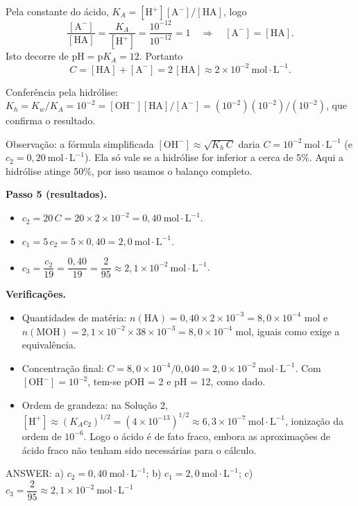 \documentclass{article}%
\begin{document}
Pela constante do ácido, $K_A = [\text{H}^+][\text{A}^-]/[\text{HA}]$, logo
\[
\frac{[\text{A}^-]}{[\text{HA}]} = \frac{K_A}{[\text{H}^+]} = \frac{10^{-12}}{10^{-12}} = 1 \quad\Rightarrow\quad [\text{A}^-] = [\text{HA}].
\]
Isto decorre de $\text{pH} = \text{p}K_A = 12$. Portanto
\[
C = [\text{HA}] + [\text{A}^-] = 2\,[\text{HA}] \approx 2 \times 10^{-2}\ \text{mol}\cdot\text{L}^{-1}.
\]

Conferência pela hidrólise: $K_h = K_w/K_A = 10^{-2} = [\text{OH}^-][\text{HA}]/[\text{A}^-] = (10^{-2})(10^{-2})/(10^{-2})$, que confirma o resultado.

Observação: a fórmula simplificada $[\text{OH}^-] \approx \sqrt{K_h\,C}$ daria $C = 10^{-2}\ \text{mol}\cdot\text{L}^{-1}$ (e $c_2 = 0{,}20\ \text{mol}\cdot\text{L}^{-1}$). Ela só vale se a hidrólise for inferior a cerca de 5\%. Aqui a hidrólise atinge 50\%, por isso usamos o balanço completo.

\textbf{Passo 5 (resultados).}
\begin{itemize}
\item[a)] $c_2 = 20\,C = 20 \times 2 \times 10^{-2} = 0{,}40\ \text{mol}\cdot\text{L}^{-1}$.
\item[b)] $c_1 = 5\,c_2 = 5 \times 0{,}40 = 2{,}0\ \text{mol}\cdot\text{L}^{-1}$.
\item[c)] $c_3 = \dfrac{c_2}{19} = \dfrac{0{,}40}{19} = \dfrac{2}{95} \approx 2{,}1\times10^{-2}\ \text{mol}\cdot\text{L}^{-1}$.
\end{itemize}

\textbf{Verificações.}
\begin{itemize}
\item Quantidades de matéria: $n(\text{HA}) = 0{,}40 \times 2\times10^{-3} = 8{,}0\times10^{-4}$ mol e $n(\text{MOH}) = 2{,}1\times10^{-2} \times 38\times10^{-3} = 8{,}0\times10^{-4}$ mol, iguais como exige a equivalência.
\item Concentração final: $C = 8{,}0\times10^{-4}/0{,}040 = 2{,}0\times10^{-2}\ \text{mol}\cdot\text{L}^{-1}$. Com $[\text{OH}^-] = 10^{-2}$, tem-se pOH = 2 e pH = 12, como dado.
\item Ordem de grandeza: na Solução 2, $[\text{H}^+] \approx (K_A c_2)^{1/2} = (4\times10^{-13})^{1/2} \approx 6{,}3\times10^{-7}\ \text{mol}\cdot\text{L}^{-1}$, ionização da ordem de $10^{-6}$. Logo o ácido é de fato fraco, embora as aproximações de ácido fraco não tenham sido necessárias para o cálculo.
\end{itemize}

ANSWER: a) $c_2 = 0{,}40\ \text{mol}\cdot\text{L}^{-1}$; b) $c_1 = 2{,}0\ \text{mol}\cdot\text{L}^{-1}$; c) $c_3 = \dfrac{2}{95} \approx 2{,}1\times10^{-2}\ \text{mol}\cdot\text{L}^{-1}$%
\newpage%
\end{document}
